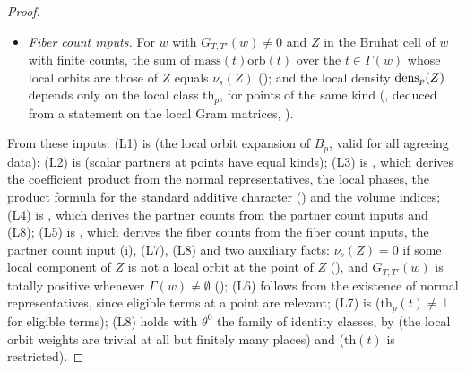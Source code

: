 \begin{proof}
\begin{itemize}
local Gram matrix of the local term of $t$, translated by $c_p(w)$ in the corner ().
(vi) The partner isomorphism count, \cref{pf:thmS-leaves:thm:partner}.
\item \emph{Fiber count inputs.} For $w$ with $G_{T,T'}(w)\ne0$ and $Z$ in the Bruhat cell of $w$ with finite counts, the sum of
$\mathrm{mass}(t)\mathrm{orb}(t)$ over the $t\in\Gamma(w)$ whose local orbits are those of $Z$ equals $\nu_s(Z)$
(); and the local density $\mathrm{dens}_p(Z)$ depends only on the local class
$\mathrm{th}_p$, for points of the same kind (, deduced from a statement on the local Gram
matrices, ).
\end{itemize}
From these inputs: (L1) is  (the local orbit expansion of $B_p$, valid
for all agreeing data); (L2) is  (scalar partners at points have equal kinds); (L3) is
, which derives the coefficient product from the normal
representatives, the local phases, the product formula for the standard additive character () and the
volume indices; (L4) is , which derives the partner counts from the partner count
inputs and (L8); (L5) is , which derives the fiber counts from the fiber count
inputs, the partner count input (i), (L7), (L8) and two auxiliary facts: $\nu_s(Z)=0$ if some local component of $Z$ is not a local
orbit at the point of $Z$ (), and $G_{T,T'}(w)$ is totally positive whenever
$\Gamma(w)\ne\emptyset$ (); (L6) follows from the existence of normal
representatives, since eligible terms at a
point are relevant; (L7) is  ($\mathrm{th}_p(t)\ne\bot$ for eligible terms); (L8) holds with
$\theta^0$ the family of identity classes, by  (the local orbit weights are trivial at
all but finitely many places) and  ($\mathrm{th}(t)$ is restricted).
\end{proof}

